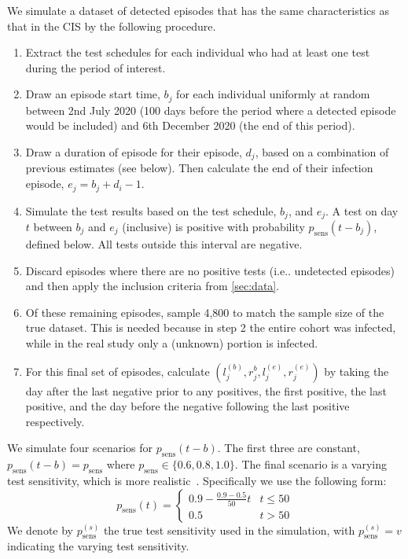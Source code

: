 \documentclass[12pt]{article}
\makeatletter
\newcommand{\psens}{p_\text{sens}}
\newcommand{\psenss}{p_\text{sens}^{(s)}}
\DeclareRobustCommand\onedot{\futurelet\@let@token\@onedot}
\def\@onedot{\ifx\@let@token.\else.\null\fi\xspace}
\def\ie{i.e\onedot} \def\Ie{{I.e}\onedot}
\makeatother
\begin{document}
We simulate a dataset of detected episodes that has the same characteristics as that in the CIS by the following procedure.
\begin{enumerate}
    \item Extract the test schedules for each individual who had at least one test during the period of interest.
    \item Draw an episode start time, $b_{j}$ for each individual uniformly at random between 2nd July 2020 (100 days before the period where a detected episode would be included) and 6th December 2020 (the end of this period).
    \item Draw a duration of episode for their episode, $d_j$, based on a combination of previous estimates (see below). Then calculate the end of their infection episode, $e_{j} = b_{j} + d_i - 1$.
    \item Simulate the test results based on the test schedule, $b_{j}$, and $e_{j}$. A test on day $t$ between $b_{j}$ and $e_{j}$ (inclusive) is positive with probability $\psens(t - b_j)$, defined below. All tests outside this interval are negative.
    \item Discard episodes where there are no positive tests (\ie undetected episodes) and then apply the inclusion criteria from \cref{sec:data}.
    \item Of these remaining episodes, sample 4,800 to match the sample size of the true dataset. This is needed because in step 2 the entire cohort was infected, while in the real study only a (unknown) portion is infected.
    \item For this final set of episodes, calculate $(l_j^{(b)}, r_j^{b}, l_j^{(e)}, r_j^{(e)})$ by taking the day after the last negative prior to any positives, the first positive, the last positive, and the day before the negative following the last positive respectively.
\end{enumerate}

We simulate four scenarios for $\psens(t - b)$.
The first three are constant, $\psens(t-b) = \psens$ where $\psens \in \{ 0.6, 0.8, 1.0 \}$.
The final scenario is a varying test sensitivity, which is more realistic~\citep{blakeThesis}.
Specifically we use the following form:
\begin{equation}
  p_\text{sens}(t) = \begin{cases}
    0.9 - \frac{0.9-0.5}{50}t &t \leq 50 \\
    0.5 &t > 50
  \end{cases}
  \label{imperf-test:eq:variable-test-sensitivity}
\end{equation}
We denote by $\psenss$ the true test sensitivity used in the simulation, with $\psenss = v$ indicating the varying test sensitivity.
\end{document}
